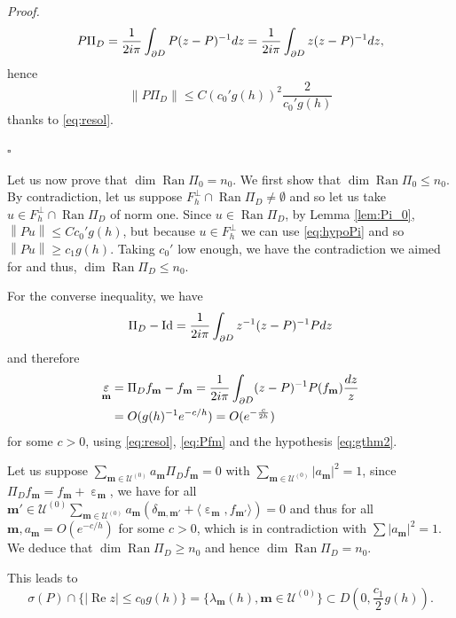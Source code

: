 \documentclass[12pt]{amsart}
\renewcommand{\Re}{\operatorname{Re}}
\newcommand{\Id}{\operatorname{Id}}
\newcommand{\Ran}{\operatorname{Ran}}
\def\<{\langle}
\def\>{\rangle}
\newcommand{\bp}{{\it Proof. }}
\newcommand{\ep}{\hfill $\square$}
\numberwithin{equation}{section}
\numberwithin{figure}{section}
\def\m{\mathbf{m}}
\DeclareMathOperator{\p}{\partial}
\DeclareMathOperator{\eps}{\varepsilon}
\newcommand{\vvert}[1]{\left\lVert#1\right\rVert}
\def\uuu{{\mathcal U}}\def\vvv{{\mathcal V}}\def\www{{\mathcal W}}\def\xxx{{\mathcal X}}
\begin{document}
\bp
\begin{equation*}
P\Pi_D = \frac{1}{2i\pi}\int_{\p\negthinspace D}P(z-P)^{-1}dz = \frac{1}{2i\pi}\int_{\p\negthinspace D}z(z-P)^{-1}dz,
\end{equation*}
hence
\begin{equation*}
\vvert{P\Pi_D}\leq C(c_0' g(h))^2\frac{2}{c_0'g(h)}
\end{equation*}
thanks to \eqref{eq:resol}.

\ep

Let us now prove that $\dim\Ran\Pi_0 = n_0$. We first show that $\dim\Ran\Pi_0\leq n_0$. By contradiction, let us suppose $F_h^\bot\cap\Ran\Pi_D\neq\emptyset$ and so let us take $u\in F_h^\bot\cap\Ran\Pi_D$ of norm one. Since $u\in\Ran\Pi_D$, by Lemma \ref{lem:Pi_0}, $\vvert{Pu}\leq Cc_0' g(h)$, but because $u\in F_h^\bot$ we can use \eqref{eq:hypoPi} and so $\vvert{Pu}\geq c_1g(h)$. Taking $c_0'$ low enough, we have the contradiction we aimed for and thus, $\dim\Ran\Pi_D\leq n_0$.

For the converse inequality, we have
\begin{equation*}
\Pi_D-\Id=\frac{1}{2i\pi}\int_{\p\negthinspace D}z^{-1}(z-P)^{-1}Pdz
\end{equation*}
and therefore
\begin{equation}\label{quasiortho}
\begin{aligned}
    \eps_\m&=\Pi_Df_\m-f_\m=\frac{1}{2i\pi}\int_{\p\negthinspace D}(z-P)^{-1}P(f_\m)\frac{dz}z\\
    &= O(g(h)^{-1}e^{-c/h})=O(e^{-\frac{c}{2h}})
\end{aligned}
\end{equation}
for some $c>0$, using \eqref{eq:resol}, \eqref{eq:Pfm} and the hypothesis \eqref{eq:gthm2}.

Let us suppose $\sum_{\m\in\uuu^{(0)}} a_\m\Pi_D f_\m = 0$ with $\sum_{\m\in\uuu^{(0)}}  |a_\m|^2 = 1$, since $\Pi_D f_\m = f_\m + \eps_\m$, we have for all $\m'\in\uuu^{(0)}\sum_{\m\in\uuu^{(0)}}  a_\m(\delta_{\m,\m'} + \<\eps_\m,f_{\m'}\>) = 0$ and thus for all $\m, a_\m = O(e^{-c/h})$ for some $c>0$, which is in contradiction with $\sum |a_\m|^2 = 1$. We deduce that $\dim\Ran\Pi_D\geq n_0$ and hence $\dim\Ran\Pi_D = n_0$.

This leads to
\begin{equation*}
\sigma(P)\cap\{|\Re z|\leq c_0g(h)\}=\{\lambda_\m(h),\m\in\uuu^{(0)}\}\subset D(0,\frac{c_1}{2} g(h)).
\end{equation*}
\end{document}
